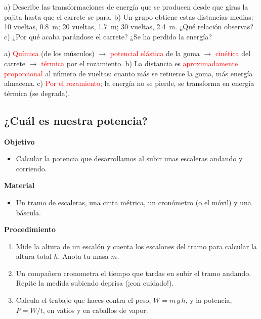 \begin{exercise}
    a) Describe las transformaciones de energía que se producen desde que giras la pajita hasta que el carrete se para. b) Un grupo
    obtiene estas distancias medias: 10 vueltas, \qty{0.8}{\m}; 20 vueltas, \qty{1.7}{\m}; 30 vueltas, \qty{2.4}{\m}. ¿Qué relación
    observas? c) ¿Por qué acaba parándose el carrete? ¿Se ha perdido la energía?
    \begin{solu}
        a) \textcolor{red}{Química} (de los músculos) \(\rightarrow\) \textcolor{red}{potencial elástica} de la goma \(\rightarrow\)
        \textcolor{red}{cinética} del carrete \(\rightarrow\) \textcolor{red}{térmica} por el rozamiento. b) La distancia es
        \textcolor{red}{aproximadamente proporcional} al número de vueltas: cuanto más se retuerce la goma, más energía almacena.
        c) \textcolor{red}{Por el rozamiento}; la energía no se pierde, se transforma en energía térmica (se degrada).
    \end{solu}
\end{exercise}

\subsection{¿Cuál es nuestra potencia?}

\noindent\begin{minipage}[t]{0.48\textwidth}
    \textbf{Objetivo}
    \begin{itemize}
        \item Calcular la potencia que desarrollamos al subir unas escaleras andando y corriendo.
    \end{itemize}
\end{minipage}\hfill
\begin{minipage}[t]{0.48\textwidth}
    \textbf{Material}
    \begin{itemize}
        \item Un tramo de escaleras, una cinta métrica, un cronómetro (o el móvil) y una báscula.
    \end{itemize}
\end{minipage}

\textbf{Procedimiento}
\begin{enumerate}[label=\numberballgreen]
    \item Mide la altura de un escalón y cuenta los escalones del tramo para calcular la altura total \(h\). Anota tu masa \(m\).
    \item Un compañero cronometra el tiempo que tardas en subir el tramo andando. Repite la medida subiendo deprisa (¡con cuidado!).
    \item Calcula el trabajo que haces contra el peso, \(W = m\,g\,h\), y la potencia, \(P = W/t\), en vatios y en caballos de vapor.
\end{enumerate}


